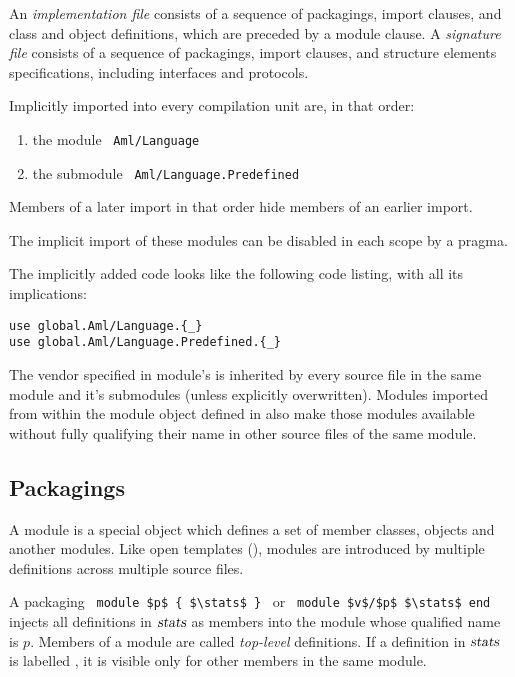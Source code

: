 An {\em implementation file} consists of a sequence of packagings, import clauses, and class and object definitions, which are preceded by a module clause. A {\em signature file} consists of a sequence of packagings, import clauses, and structure elements specifications, including interfaces and protocols. 

Implicitly imported into every compilation unit are, in that order: 
\begin{enumerate}
\item the module ~\lstinline!Aml/Language! 
\item the submodule ~\lstinline!Aml/Language.Predefined!
\end{enumerate} 
Members of a later import in that order hide members of an earlier import. 

The implicit import of these modules can be disabled in each scope by a pragma. %


The implicitly added code looks like the following code listing, with all its implications:
\begin{lstlisting}
use global.Aml/Language.{_}
use global.Aml/Language.Predefined.{_}
\end{lstlisting}

The vendor specified in module's  is inherited by every source file in the same module and it's submodules (unless explicitly overwritten). Modules imported from within the module object defined in  also make those modules available without fully qualifying their name in other source files of the same module. 





\subsection{Packagings}

A module is a special object which defines a set of member classes, objects and another modules. Like open templates (), modules are introduced by multiple definitions across multiple source files.  

A packaging ~\lstinline!module $p$ { $\stats$ }!~ or ~\lstinline!module $v$/$p$ $\stats$ end!~ injects all definitions in $\mbox{\sl stats}$ as members into the module whose qualified name is $p$. Members of a module are called {\em top-level} definitions. If a definition in $\mbox{\sl stats}$ is labelled , it is visible only for other members in the same module. 


